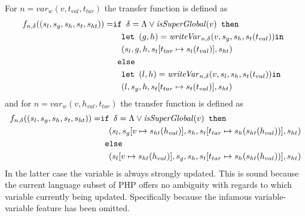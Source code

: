 For $n = \mathit{var}_w(v,t_{val},t_{tar})$ the transfer function is defined as
\begin{align}
f_{n, \delta} ((s_l,s_g,s_h,s_t, s_{ht})) = &\texttt{if }\delta = \Lambda \vee \mathit{isSuperGlobal}(v)\texttt{ then } \notag\\
                                            &\quad\texttt{let } (g,h) = \mathit{writeVar}_{n,\delta}(v, s_g, s_h, s_t(t_{val})) \texttt{in }\notag\\
                                            &\quad (s_l,g,h,s_t[t_{tar}\mapsto s_t(t_{val})], s_{ht})\notag\\
                                            & \texttt{ else } \notag\\
                                            &\quad\texttt{let } (l,h) = \mathit{writeVar}_{n,\delta}(v, s_l, s_h, s_t(t_{val})) \texttt{in }\notag\\
                                            &\quad (l,s_g,h,s_t[t_{tar}\mapsto s_t(t_{val})], s_{ht})
\end{align}
and for $n = \mathit{var}_w(v,h_{val},t_{tar})$ the transfer function is defined as
\begin{align}
f_{n, \delta} ((s_l,s_g,s_h,s_t, s_{ht})) = &\texttt{if }\delta = \Lambda \vee \mathit{isSuperGlobal}(v)\texttt{ then } \notag\\
                                            &\quad (s_l,s_g[v\mapsto s_{ht}(h_{val})],s_h,s_t[t_{tar}\mapsto s_h(s_{ht}(h_{val}))], s_{ht})\notag\\
                                            & \texttt{ else } \notag\\
                                            &\quad (s_l[v\mapsto s_{ht}(h_{val})],s_g,s_h,s_t[t_{tar}\mapsto s_h(s_{ht}(h_{val}))], s_{ht})
\end{align}
In the latter case the variable is always strongly updated. This is sound because the current language subset of PHP offers no ambiguity with regards to which variable currently being updated. Specifically because the infamous variable-variable feature has been omitted.


